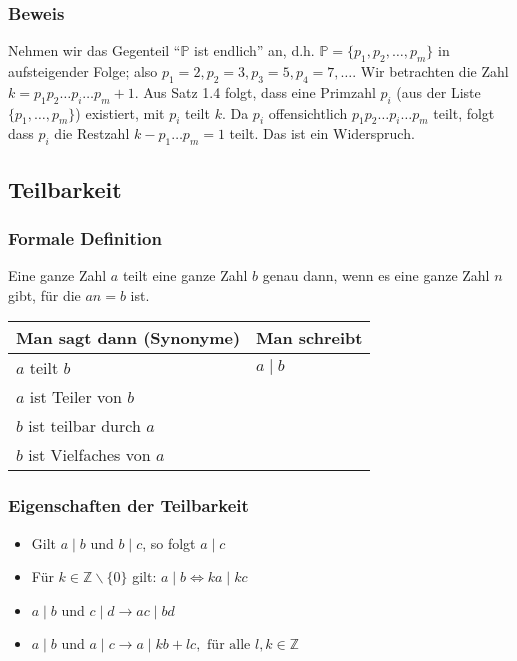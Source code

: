 \subsubsection*{Beweis}
Nehmen wir das Gegenteil ``$\mathbb{P}$ ist endlich'' an, d.h. $\mathbb{P}=\{p_1,p_2,\dots,p_m\}$ in aufsteigender Folge; also $p_1=2,p_2=3,p_3=5,p_4=7,\dots$. Wir betrachten die Zahl $k=p_1 p_2\dots p_i \dots p_m+1$. Aus Satz 1.4 folgt, dass eine Primzahl $p_i$ (aus der Liste $\{p_1 ,\dots , p_{m}\}$) existiert, mit $p_i$ teilt $k$. Da $p_i$ offensichtlich $p_1 p_2\dots p_i \dots p_m$ teilt, folgt dass $p_i$ die Restzahl $k-p_1\dots p_{m}=1$ teilt. Das ist ein Widerspruch. 

\subsection*{Teilbarkeit}
\subsubsection{Formale Definition}
Eine ganze Zahl $a$ teilt eine ganze Zahl $b$ genau dann, wenn es eine ganze Zahl $n$ gibt, für die $an=b$ ist. \\
\begin{center}
\begin{tabular}{l|l}
Man sagt dann (Synonyme) & Man schreibt \\\hline 
$a$ teilt $b$ & $a\mid b$\\
$a$ ist Teiler von $b$ & ~\\
$b$ ist teilbar durch $a$ & ~\\
$b$ ist Vielfaches von $a$ & ~\\
\end{tabular}
\end{center}

\subsubsection*{Eigenschaften der Teilbarkeit}
\begin{itemize}
\item Gilt $a\mid b$ und $b\mid c$, so folgt $a\mid c$
\item Für $k\in\mathbb{Z}\backslash\{0\}$ gilt: $a\mid b\Longleftrightarrow ka\mid kc$ 
\item $a\mid b$ und $c\mid d\to ac\mid bd$
\item $a\mid b$ und $a\mid c\to a\mid kb+lc,\text{    für alle }l,k\in\mathbb{Z}$
\end{itemize}

